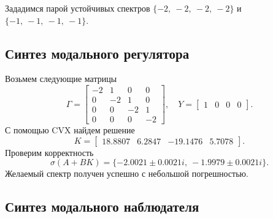 \noindent Зададимся парой устойчивых спектров $\{-2,\ -2,\ -2,\ -2\}$ и $\{-1,\ -1,\ -1,\ -1\}$.


\subsection{Синтез модального регулятора}

Возьмем следующие матрицы
\begin{equation*}
    \Gamma=\begin{bmatrix}
        -2&  1& 0& 0\\
        0& -2& 1& 0\\
        0& 0& -2& 1\\
        0& 0& 0& -2
    \end{bmatrix},\quad
    Y=\begin{bmatrix}
        1& 0& 0& 0
    \end{bmatrix}.
\end{equation*}
С помощью CVX найдем решение
\begin{equation*}
    K=\begin{bmatrix}
        18.8807&	6.2847&	-19.1476&	5.7078
    \end{bmatrix}.
\end{equation*}
Проверим корректность
\begin{equation*}
    \sigma(A+BK)=\{
        -2.0021 \pm 0.0021i,\ 
        -1.9979 \pm 0.0021i\}.
\end{equation*}
Желаемый спектр получен успешно с небольшой погрешностью.


\subsection{Синтез модального наблюдателя}


